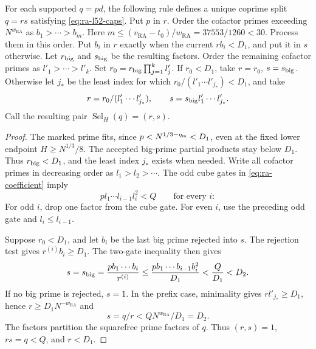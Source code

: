 \begin{lemma}\label{lem:ra-selector}
For each supported \(q=pd\), the following rule defines a unique coprime
split \(q=rs\) satisfying \eqref{eq:ra-l52-caps}. Put \(p\) in \(r\).
Order the cofactor primes exceeding \(N^{w_{\mathrm{RA}}}\) as
\(b_1>\cdots>b_m\).
Here \(m\le(v_{\mathrm{RA}}-t_0)/w_{\mathrm{RA}}=37553/1260<30\). Process them in this order.
Put \(b_i\) in \(r\) exactly when the current \(r b_i<D_1\), and put it
in \(s\) otherwise. Let \(r_{\rm big}\) and \(s_{\rm big}\) be the
resulting factors.
Order the remaining cofactor primes as
\(l'_1>\cdots>l'_k\). Set
\(r_0=r_{\rm big}\prod_{j=1}^k l'_j\). If \(r_0<D_1\), take
\(r=r_0\), \(s=s_{\rm big}\). Otherwise let \(j_*\) be the least index
for which \(r_0/(l'_1\cdots l'_{j_*})<D_1\), and take
\[
 r=r_0/(l'_1\cdots l'_{j_*}),\qquad
 s=s_{\rm big}l'_1\cdots l'_{j_*}.
\]
Call the resulting pair \(\operatorname{Sel}_H(q)=(r,s)\).
\end{lemma}
\begin{proof}
The marked prime fits, since
\(p<N^{1/3-\eta_{\rm m}}<D_1\), even at the fixed lower endpoint
\(H\ge N^{1/3}/8\). The accepted big-prime partial products stay below
\(D_1\).
Thus \(r_{\rm big}<D_1\), and the least index \(j_*\) exists
when needed. Write all cofactor primes in decreasing order as
\(l_1>l_2>\cdots\). The odd cube gates in \eqref{eq:ra-coefficient}
imply
\[
 p l_1\cdots l_{i-1}l_i^2<Q\qquad\text{for every }i:
\]
For odd \(i\), drop one factor from the cube gate.
For even \(i\), use
the preceding odd gate and \(l_i\le l_{i-1}\).

Suppose \(r_0<D_1\), and let \(b_i\) be the last big prime rejected
into \(s\). The rejection test gives \(r^{(i)}b_i\ge D_1\). The
two-gate inequality then gives
\[
 s=s_{\rm big}
 =\frac{p b_1\cdots b_i}{r^{(i)}}
 \le\frac{p b_1\cdots b_{i-1}b_i^2}{D_1}<\frac Q{D_1}<D_2.
\]
If no big
prime is rejected, \(s=1\). In the prefix case, minimality gives
\(r l'_{j_*}\ge D_1\), hence \(r\ge D_1N^{-w_{\mathrm{RA}}}\) and
\[
 s=q/r<QN^{w_{\mathrm{RA}}}/D_1=D_2.
\]
The factors partition the squarefree prime factors of \(q\).
Thus
\((r,s)=1\), \(rs=q<Q\), and \(r<D_1\).
\end{proof}

